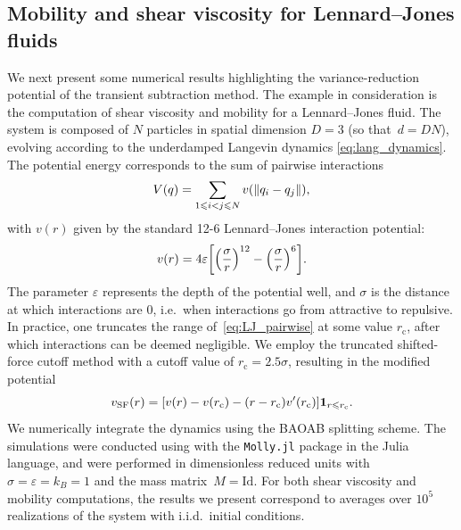 \subsection{Mobility and shear viscosity for Lennard--Jones fluids}
\label{subsec:num_LJ}
%
We next present some numerical results highlighting the variance-reduction potential of the transient subtraction method. The example in consideration is the computation of shear viscosity and mobility for a Lennard--Jones fluid. The system is composed of $N$ particles in spatial dimension $D=3$ (so that~$d=DN$), evolving according to the underdamped Langevin dynamics \eqref{eq:lang_dynamics}. The potential energy corresponds to the sum of pairwise interactions
%
\begin{equation}
	V(q) = \sum_{1\leqslant i<j\leqslant N} v(\lVert q_i - q_j\rVert),
\end{equation}
%
with $v(r)$ given by the standard 12-6 Lennard--Jones interaction potential:
%
\begin{equation}
	v(r) = 4\eps\bkt*{\paren*{\frac{\sigma}{r}}^{12} - \paren*{\frac{\sigma}{r}}^6}.
	\label{eq:LJ_pairwise}
\end{equation}
%
The parameter $\varepsilon$ represents the depth of the potential well, and $\sigma$ is the distance at which interactions are 0, i.e.\ when interactions go from attractive to repulsive. In practice, one truncates the range of~\eqref{eq:LJ_pairwise} at some value $r_\mathrm{c}$, after which interactions can be deemed negligible. We employ the truncated shifted-force cutoff method with a cutoff value of $r_\mathrm{c}=2.5\sigma$, resulting in the modified potential
%
\begin{equation}
	v_\mathrm{SF}(r) = [v(r) - v(r_\mathrm{c}) - (r - r_\mathrm{c})v'(r_\mathrm{c})]\mathbf{1}_{r\leqslant r_\mathrm{c}}.
\end{equation}
%  
We numerically integrate the dynamics using the BAOAB splitting scheme. The simulations were conducted using with the \texttt{Molly.jl} package \cite{greener2024} in the Julia language, and were performed in dimensionless reduced units with $\sigma = \varepsilon = k_B = 1$ and the mass matrix~$M = \mathrm{Id}$. For both shear viscosity and mobility computations, the results we present correspond to averages over $10^5$ realizations of the system with i.i.d.\ initial conditions. 


